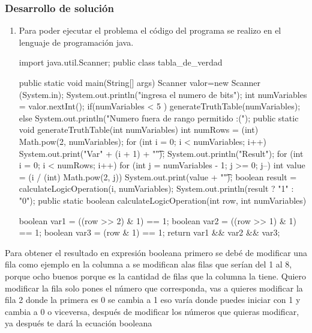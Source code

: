 \subsubsection {Desarrollo de solución}
\begin{enumerate}
    \item Para poder ejecutar el problema el código del programa se realizo en el lenguaje de programación java.
    \begin{javaCode}
     import java.util.Scanner;
    public class tabla_de_verdad {
        public static void main(String[] args) {
            Scanner valor=new Scanner (System.in);
            System.out.println("ingresa el numero de bits");
           int numVariables = valor.nextInt(); 
          if(numVariables < 5 ){
            generateTruthTable(numVariables);
        }else{
                System.out.println("Numero fuera de rango permitido :(");
    }
        }
        public static void generateTruthTable(int numVariables) {
            int numRows = (int) Math.pow(2, numVariables);      
            for (int i = 0; i < numVariables; i++) {
                System.out.print("Var" + (i + 1) + "\t");
            }
            System.out.println("Result");
            for (int i = 0; i < numRows; i++) {
                for (int j = numVariables - 1; j >= 0; j--) {
                    int value = (i / (int) Math.pow(2, j)) %
                    System.out.print(value + "\t");
                }
                boolean result = calculateLogicOperation(i, numVariables);
                System.out.println(result ? "1" : "0");
            }
        }
        public static boolean calculateLogicOperation(int row, int numVariables) {
    
            boolean var1 = ((row >> 2) & 1) == 1;
            boolean var2 = ((row >> 1) & 1) == 1;
            boolean var3 = (row & 1) == 1;
            return var1 && var2 && var3;
        }
    }
    
     \end{javaCode}
\end{enumerate}
Para obtener el resultado en expresión booleana primero se debé de modificar una fila como ejemplo en la columna a se modifican alas filas que serían del 1 al 8, porque ocho buenos porque  es la cantidad de filas que la columna la tiene.
 Quiero modificar la fila solo pones el número que corresponda, vas a quieres modificar la fila 2 donde la primera es 0 se cambia a 1 eso varía donde puedes iniciar con 1 y cambia a 0 o viceversa, después de modificar los números que quieras modificar, ya después te dará la ecuación booleana
 
